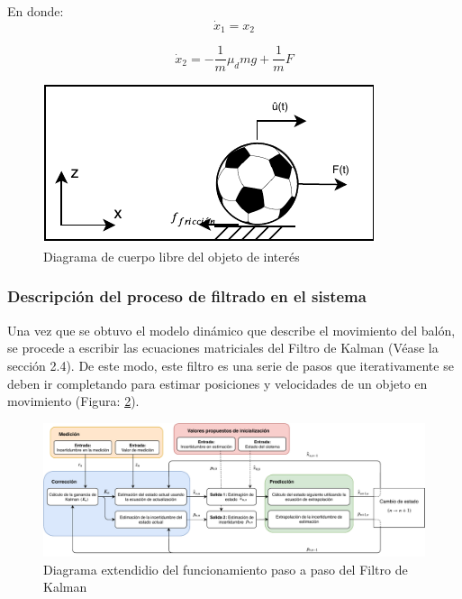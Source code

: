 En donde:
\begin{equation}
\dot{x}_1 = x_2
\label{eq:state_variable_1}
\end{equation}

\begin{equation}
\dot{x}_2 = -\frac{1}{m}\mu_d m g + \frac{1}{m}F
\label{eq:state_variable_2}
\end{equation}


\begin{figure}
\centering
\includegraphics[scale=1.5]{images/dynamic_model.pdf}
\caption{Diagrama de cuerpo libre del objeto de interés}
\label{fig:dynamic_model}
\end{figure}

		\subsubsection*{Descripción del proceso de filtrado en el sistema}
Una vez que se obtuvo el modelo dinámico que describe el movimiento del balón, se procede a escribir las ecuaciones matriciales del Filtro de Kalman (Véase la sección 2.4). De este modo, este filtro es una serie de pasos que iterativamente se deben ir completando para estimar posiciones y velocidades de un objeto en movimiento (Figura: \ref{fig:kalman_extended_diagram}).

\begin{figure}
\centering
\includegraphics[scale=0.6]{images/kalman_extended_diagram.pdf}
\caption{Diagrama extendidio del funcionamiento paso a paso del Filtro de Kalman}
\label{fig:kalman_extended_diagram}
\end{figure}

